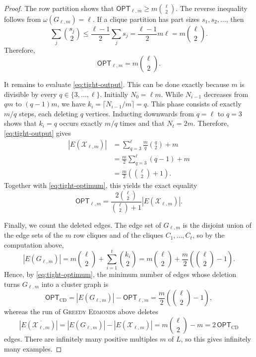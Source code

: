 \documentclass[a4paper,fleqn]{cas-sc}
\theoremstyle{remark}
\theoremstyle{plain}
\newcommand{\edmonds}{{\textsc{Greedy Edmonds}}}
\newcommand{\opt}{{\mathsf{OPT}}}
\begin{document}
\begin{proof}
The row partition shows that
$\opt_{\ell,m}\geq m\binom{\ell}{2}$. The reverse inequality follows
from $\omega(G_{\ell,m})=\ell$. If a clique partition has part sizes
$s_1,s_2,\ldots$, then
\[
   \sum_j\binom{s_j}{2}
   \leq\frac{\ell-1}{2}\sum_j s_j
   =\frac{\ell-1}{2}m\ell
   =m\binom{\ell}{2}.
\]
Therefore,
\begin{equation} \label{eq:tight-optimum}
   \opt_{\ell,m}=m\binom{\ell}{2}.
\end{equation}

It remains to evaluate \eqref{eq:tight-output}. This can be done
exactly because $m$ is divisible by every
$q\in\{3,\ldots,\ell\}$. Initially $N_0=\ell m$. While
$N_{i-1}$ decreases from $qm$ to $(q-1)m$, we have
$k_i=\lceil N_{i-1}/m\rceil=q$. This phase consists of exactly
$m/q$ steps, each deleting $q$ vertices. Inducting downwards from
$q=\ell$ to $q=3$ shows that $k_i=q$ occurs exactly $m/q$ times and
that $N_t=2m$. Therefore, \eqref{eq:tight-output} gives
\begin{align*}
|E(\mathcal{X}_{\ell,m})|
 &=\sum_{q=3}^{\ell}\frac{m}{q}\binom{q}{2}+m\\
 &=\frac{m}{2}\sum_{q=3}^{\ell}(q-1)+m\\
 &=\frac{m}{2}\left(\binom{\ell}{2}+1\right).
\end{align*}
Together with \eqref{eq:tight-optimum}, this yields the exact equality
\[
\opt_{\ell,m}
=\frac{2\binom{\ell}{2}}{\binom{\ell}{2}+1}
 |E(\mathcal{X}_{\ell,m})|.
\]

Finally, we count the deleted edges. The edge set of $G_{\ell,m}$ is the disjoint union of the edge sets of the $m$ row cliques and of the cliques $C_1,\ldots,C_t$, so by the computation above,
\[
   |E(G_{\ell,m})|
   = m\binom{\ell}{2}+\sum_{i=1}^{t}\binom{k_i}{2}
   = m\binom{\ell}{2}+\frac{m}{2}\left(\binom{\ell}{2}-1\right).
\]
Hence, by \eqref{eq:tight-optimum}, the minimum number of edges whose deletion turns $G_{\ell,m}$ into a cluster graph is
\[
   \opt_{\mathrm{CD}}=|E(G_{\ell,m})|-\opt_{\ell,m}
   =\frac{m}{2}\left(\binom{\ell}{2}-1\right),
\]
whereas the run of \edmonds{} above deletes
\[
   |E(\overline{\mathcal{X}_{\ell,m}})|
   =|E(G_{\ell,m})|-|E(\mathcal{X}_{\ell,m})|
   =m\binom{\ell}{2}-m
   =2\,\opt_{\mathrm{CD}}
\]
edges. There are infinitely many positive multiples $m$ of $L$, so this
gives infinitely many examples.
\end{proof}
\end{document}
